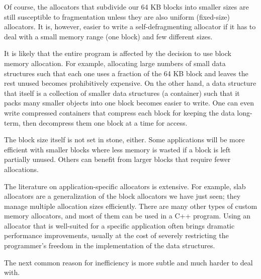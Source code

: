 Of course, the allocators that subdivide our 64 KB blocks into smaller sizes are still susceptible to fragmentation unless they are also uniform (fixed-size) allocators. It is, however, easier to write a self-defragmenting allocator if it has to deal with a small memory range (one block) and few different sizes. 

It is likely that the entire program is affected by the decision to use block memory allocation. For example, allocating large numbers of small data structures such that each one uses a fraction of the 64 KB block and leaves the rest unused becomes prohibitively expensive. On the other hand, a data structure that itself is a collection of smaller data structures (a container) such that it packs many smaller objects into one block becomes easier to write. One can even write compressed containers that compress each block for keeping the data long-term, then decompress them one block at a time for access. 

The block size itself is not set in stone, either. Some applications will be more efficient with smaller blocks where less memory is wasted if a block is left partially unused. Others can benefit from larger blocks that require fewer allocations.

The literature on application-specific allocators is extensive. For example, slab allocators are a generalization of the block allocators we have just seen; they manage multiple allocation sizes efficiently. There are many other types of custom memory allocators, and most of them can be used in a C++ program. Using an allocator that is well-suited for a specific application often brings dramatic performance improvements, usually at the cost of severely restricting the programmer’s freedom in the implementation of the data structures.

The next common reason for inefficiency is more subtle and much harder to deal with.





















